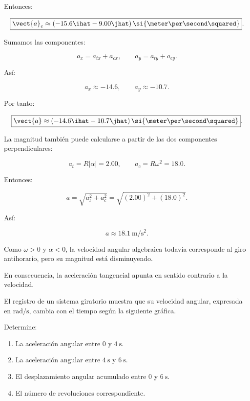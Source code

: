 \begin{explicacion}
Entonces:

\[
\boxed{
\vect{a}_c
\approx(-15.6\ihat-9.00\jhat)\,
\si{\meter\per\second\squared}
}.
\]

Sumamos las componentes:

\[
a_x=a_{tx}+a_{cx},
\qquad
a_y=a_{ty}+a_{cy}.
\]

Así:

\[
a_x\approx-14.6,
\qquad
a_y\approx-10.7.
\]

Por tanto:

\[
\boxed{
\vect{a}
\approx(-14.6\ihat-10.7\jhat)\,
\si{\meter\per\second\squared}
}.
\]

La magnitud también puede calcularse a partir de las dos
componentes perpendiculares:

\[
a_t=R|\alpha|=2.00,
\qquad
a_c=R\omega^2=18.0.
\]

Entonces:

\[
a=\sqrt{a_t^2+a_c^2}
=\sqrt{(2.00)^2+(18.0)^2}.
\]

Así:

\[
\boxed{a\approx\SI{18.1}{\meter\per\second\squared}}.
\]

Como \(\omega>0\) y \(\alpha<0\), la velocidad angular
algebraica todavía corresponde al giro antihorario, pero
su magnitud está disminuyendo.

En consecuencia, la aceleración tangencial apunta en
sentido contrario a la velocidad.
\end{explicacion}


\begin{ejercicio}
El registro de un sistema giratorio muestra que su velocidad
angular, expresada en \(\si{\radian\per\second}\), cambia con el
tiempo según la siguiente gráfica.

\begin{center}
\end{center}

Determine:

\begin{enumerate}[label=\alph*)]
    \item La aceleración angular entre \(0\) y \(\SI{4}{\second}\).
    \item La aceleración angular entre \(\SI{4}{\second}\) y
    \(\SI{6}{\second}\).
    \item El desplazamiento angular acumulado entre \(0\) y
    \(\SI{6}{\second}\).
    \item El número de revoluciones correspondiente.
\end{enumerate}
\end{ejercicio}

